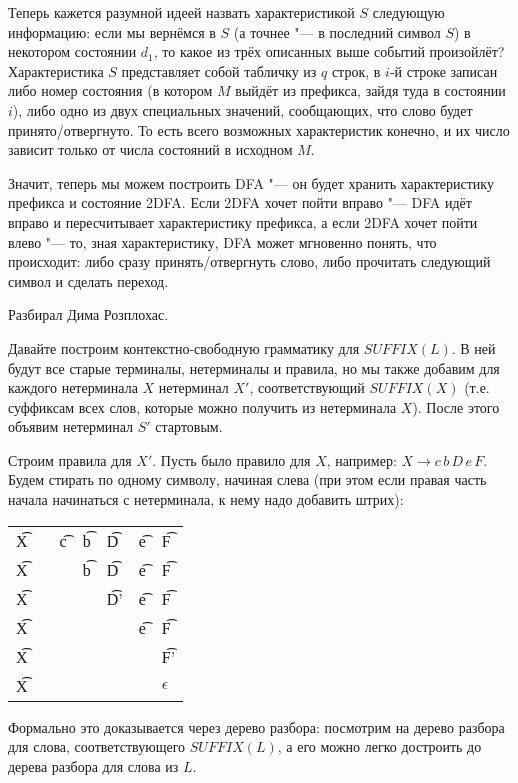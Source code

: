 	Теперь кажется разумной идеей назвать характеристикой $S$ следующую информацию:
	если мы вернёмся в $S$ (а точнее "--- в последний символ $S$) в некотором состоянии $d_1$,
	то какое из трёх описанных выше событий произойлёт?
	Характеристика $S$ представляет собой табличку из $q$ строк, в $i$-й строке записан либо
	номер состояния (в котором $M$ выйдёт из префикса, зайдя туда в состоянии $i$), либо
	одно из двух специальных значений, сообщающих, что слово будет принято/отвергнуто.
	То есть всего возможных характеристик конечно, и их число зависит только от числа состояний в
	исходном $M$.

	Значит, теперь мы можем построить DFA "--- он будет хранить характеристику префикса и состояние 2DFA.
	Если 2DFA хочет пойти вправо "--- DFA идёт вправо и пересчитывает характеристику префикса,
	а если 2DFA хочет пойти влево "--- то, зная характеристику, DFA может мгновенно понять, что происходит:
	либо сразу принять/отвергнуть слово, либо прочитать следующий символ и сделать переход.

	Разбирал Дима Розплохас.

	Давайте построим контекстно-свободную грамматику для $SUFFIX(L)$.
	В ней будут все старые терминалы, нетерминалы и правила, но мы также
	добавим для каждого нетерминала $X$ нетерминал $X'$, соответствующий $SUFFIX(X)$
	(т.е. суффиксам всех слов, которые можно получить из нетерминала $X$).
	После этого объявим нетерминал $S'$ стартовым.

	Строим правила для $X'$.
	Пусть было правило для $X$, например: $X \to c\,b\,D\,e\,F$.
	Будем стирать по одному символу, начиная слева (при этом если правая часть начала начинаться с нетерминала,
	к нему надо добавить штрих):
	\begin{center}
		\begin{tabular}{rclllll}
			\t{X} &\to& \t{c}&\t{b}&\t{D}&\t{e}&\t{F} \\
			\t{X} &\to&      &\t{b}&\t{D}&\t{e}&\t{F} \\
			\t{X} &\to&      &     &\t{D'}&\t{e}&\t{F} \\
			\t{X} &\to&      &     &      &\t{e}&\t{F} \\
			\t{X} &\to&      &     &      &     &\t{F'} \\
			\t{X} &\to&      &     &      &     &$\epsilon$ \\
		\end{tabular}
	\end{center}
	Формально это доказывается через дерево разбора: посмотрим на дерево разбора для слова,
	соответствующего $SUFFIX(L)$, а его можно легко достроить до дерева разбора для слова из $L$.

